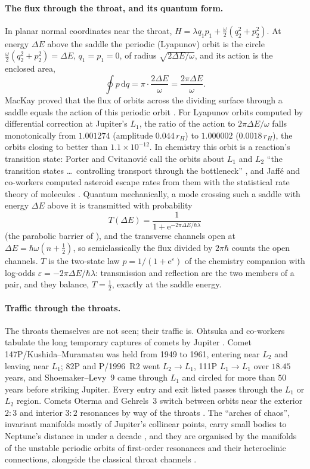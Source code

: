\documentclass[11pt]{article}
\theoremstyle{definition}\newtheorem{definition}[theorem]{Definition}
\theoremstyle{remark}\newtheorem{remark}[theorem]{Remark}
\newcommand{\dd}{\,\mathrm d}\newcommand{\e}{\mathrm e}
\begin{document}
\paragraph{The flux through the throat, and its quantum form.} In planar normal coordinates near the throat, $H=\lambda q_1p_1+\frac\omega2(q_2^2+p_2^2)$. At energy $\Delta E$ above the saddle the periodic (Lyapunov) orbit is the circle $\frac\omega2(q_2^2+p_2^2)=\Delta E$, $q_1=p_1=0$, of radius $\sqrt{2\Delta E/\omega}$, and its action is the enclosed area,
\[
\oint p\dd q=\pi\cdot\frac{2\Delta E}{\omega}=\frac{2\pi\Delta E}{\omega}.
\]
MacKay proved that the flux of orbits across the dividing surface through a saddle equals the action of this periodic orbit \cite{MacKay}. For Lyapunov orbits computed by differential correction at Jupiter's $L_1$, the ratio of the action to $2\pi\Delta E/\omega$ falls monotonically from $1.001274$ (amplitude $0.044\,r_H$) to $1.000002$ ($0.0018\,r_H$), the orbits closing to better than $1.1\times10^{-12}$. In chemistry this orbit is a reaction's transition state: Porter and Cvitanovi\'c call the orbits about $L_1$ and $L_2$ ``the transition states \ldots\ controlling transport through the bottleneck'' \cite{PorterCv}, and Jaff\'e and co-workers computed asteroid escape rates from them with the statistical rate theory of molecules \cite{Jaffe}. Quantum mechanically, a mode crossing such a saddle with energy $\Delta E$ above it is transmitted with probability
\[
T(\Delta E)=\frac1{1+\e^{-2\pi\Delta E/\hbar\lambda}}
\]
(the parabolic barrier of \cite[\S50]{LL}), and the transverse channels open at $\Delta E=\hbar\omega(n+\frac12)$, so semiclassically the flux divided by $2\pi\hbar$ counts the open channels. $T$ is the two-state law $p=1/(1+\e^{\varepsilon})$ of the chemistry companion \cite{SChem} with log-odds $\varepsilon=-2\pi\Delta E/\hbar\lambda$: transmission and reflection are the two members of a pair, and they balance, $T=\frac12$, exactly at the saddle energy.

\paragraph{Traffic through the throats.} The throats themselves are not seen; their traffic is. Ohtsuka and co-workers tabulate the long temporary captures of comets by Jupiter \cite{Ohtsuka}. Comet 147P/Kushida--Muramatsu was held from 1949 to 1961, entering near $L_2$ and leaving near $L_1$; 82P and P/1996~R2 went $L_2\to L_1$, 111P $L_1\to L_1$ over $18.45$ years, and Shoemaker--Levy~9 came through $L_1$ and circled for more than $50$ years before striking Jupiter. Every entry and exit listed passes through the $L_1$ or $L_2$ region. Comets Oterma and Gehrels~3 switch between orbits near the exterior $2{:}3$ and interior $3{:}2$ resonances by way of the throats \cite{KLMR}. The ``arches of chaos'', invariant manifolds mostly of Jupiter's collinear points, carry small bodies to Neptune's distance in under a decade \cite{Todorovic}, and they are organised by the manifolds of the unstable periodic orbits of first-order resonances and their heteroclinic connections, alongside the classical throat channels \cite{Guido}.
\end{document}
